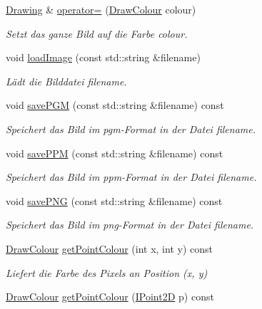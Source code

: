 \begin{DoxyCompactItemize}
\mbox{\hyperlink{classDrawing}{Drawing}} \& \mbox{\hyperlink{classDrawing_a530fbd926b17ea337b4a1c703d95e449}{operator=}} (\mbox{\hyperlink{classDrawColour}{Draw\+Colour}} colour)
\begin{DoxyCompactList}\small\item\em Setzt das ganze Bild auf die Farbe {\ttfamily colour}. \end{DoxyCompactList}\item 
void \mbox{\hyperlink{classDrawing_add2536b3ea8de4f033cb53f0d66192b1}{load\+Image}} (const std\+::string \&filename)
\begin{DoxyCompactList}\small\item\em Lädt die Bilddatei {\ttfamily filename}. \end{DoxyCompactList}\item 
void \mbox{\hyperlink{classDrawing_a55355208f1dc677fd30806b170a14bcf}{save\+P\+GM}} (const std\+::string \&filename) const
\begin{DoxyCompactList}\small\item\em Speichert das Bild im pgm-\/\+Format in der Datei {\ttfamily filename}. \end{DoxyCompactList}\item 
void \mbox{\hyperlink{classDrawing_a8e6f3bd4617ef1f84635c6983a4840c1}{save\+P\+PM}} (const std\+::string \&filename) const
\begin{DoxyCompactList}\small\item\em Speichert das Bild im ppm-\/\+Format in der Datei {\ttfamily filename}. \end{DoxyCompactList}\item 
void \mbox{\hyperlink{classDrawing_aae4e25704b69cef5d37a7c5db860336d}{save\+P\+NG}} (const std\+::string \&filename) const
\begin{DoxyCompactList}\small\item\em Speichert das Bild im png-\/\+Format in der Datei {\ttfamily filename}. \end{DoxyCompactList}\item 
\mbox{\hyperlink{classDrawColour}{Draw\+Colour}} \mbox{\hyperlink{classDrawing_a7bd8894ca2d1a9e5cd4945ede17ca167}{get\+Point\+Colour}} (int x, int y) const
\begin{DoxyCompactList}\small\item\em Liefert die Farbe des Pixels an Position ({\ttfamily x}, {\ttfamily y}) \end{DoxyCompactList}\item 
\mbox{\hyperlink{classDrawColour}{Draw\+Colour}} \mbox{\hyperlink{classDrawing_ad25dde1cf53c3858121f940ece8f9d96}{get\+Point\+Colour}} (\mbox{\hyperlink{point2d_8h_aeeeb57e4186edb0a4274b64925e0d0fb}{I\+Point2D}} p) const

\end{DoxyCompactItemize}
